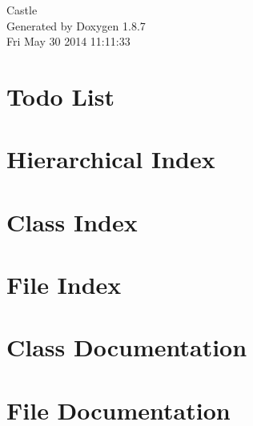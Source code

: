 \documentclass[twoside]{book}
\newcommand{\+}{\discretionary{\mbox{\scriptsize$\hookleftarrow$}}{}{}}
\newcommand{\clearemptydoublepage}{%
  \newpage{\pagestyle{empty}\cleardoublepage}%
}
\begin{document}
\hypersetup{pageanchor=false,
             bookmarks=true,
             bookmarksnumbered=true,
             pdfencoding=unicode
            }
\begin{titlepage}
\vspace*{7cm}
\begin{center}%
{\Large Castle }\\
\vspace*{1cm}
{\large Generated by Doxygen 1.8.7}\\
\vspace*{0.5cm}
{\small Fri May 30 2014 11:11:33}\\
\end{center}
\end{titlepage}
\clearemptydoublepage
\tableofcontents
\clearemptydoublepage
{}
\hypersetup{pageanchor=true}

\chapter{Todo List}
\label{todo}
\hypertarget{todo}{}

\chapter{Hierarchical Index}

\chapter{Class Index}

\chapter{File Index}

\chapter{Class Documentation}





















\chapter{File Documentation}


































\newpage
{}
{}
\printindex
\end{document}
